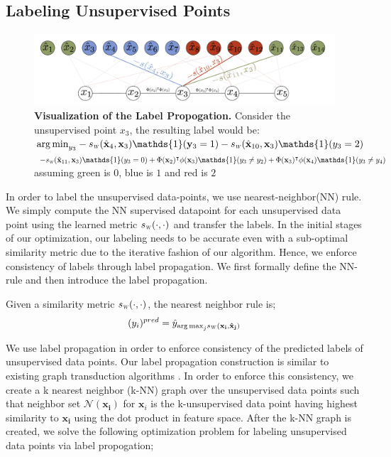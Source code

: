 \subsection{Labeling Unsupervised Points}
\label{label}
\begin{figure}[ht]
\includegraphics[width=\columnwidth]{figure1}
\caption{\textbf{Visualization of the Label Propogation.} Consider the unsupervised point $x_3$, the  resulting label would be:
\mbox{ ${\arg\min}_{y_3} -\sw(\hat{\mathbf{x}}_4,\mathbf{x}_3)\mathds{1}(\mathbf{y}_3=1) -\sw(\hat{\mathbf{x}}_{10},\mathbf{x}_3)\mathds{1}(y_3=2)$} $ -\sw(\hat{\mathbf{x}}_{11},\mathbf{x}_3)\mathds{1}(y_3=0) + \Phi(\mathbf{x}_2)^\intercal\phi(\mathbf{x}_3)\mathds{1}(y_3 \neq y_2) +\Phi(\mathbf{x}_3)^\intercal\phi(\mathbf{x}_4)\mathds{1}(y_3 \neq y_4) $ assuming green is $0$, blue is $1$ and red is $2$}
\label{vis_label_prop}
\end{figure}
In order to label the unsupervised data-points, we use nearest-neighbor(NN) rule. We simply compute the NN supervised datapoint for each unsupervised data point using the learned metric $\sw(\cdot,\cdot)$ and transfer the labels. In the initial stages of our optimization, our labeling needs to be accurate even with a sub-optimal similarity metric due to the iterative fashion of our algorithm. Hence, we enforce consistency of labels through label propagation. We first formally define the NN-rule and then introduce the label propagation.

Given a similarity metric $\sw(\cdot,\cdot)$, the nearest neighbor rule is;
\begin{equation}
(y_i)^{pred} = \hat{y}_{{\arg\max}_j \sw(\mathbf{x_i}, \mathbf{\hat{x}_j})}
\end{equation}

We use label propagation in order to enforce consistency of the predicted labels of unsupervised data points. Our label propagation construction is similar to existing graph transduction algorithms \cite{label_prop1,label_prop2}. In order to enforce this consistency, we create a k nearest neighbor (k-NN) graph over the unsupervised data points such that neighbor set $\mathcal{N}(\mathbf{x_i})$ for $\mathbf{x}_i$ is the k-unsupervised data point having highest similarity to $\mathbf{x_i}$ using the dot product in feature space. After the k-NN graph is created, we solve the following optimization problem for labeling unsupervised data points via label propogation;

